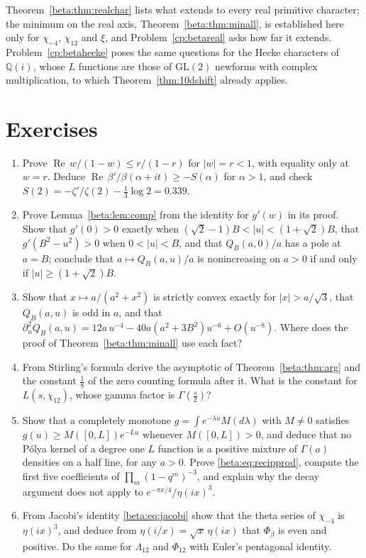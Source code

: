 Theorem~\ref{beta:thm:realchar} lists what extends to every real primitive character; the minimum on the real axis, Theorem~\ref{beta:thm:minall}, is established here only for $\chi_{-4}$, $\chi_{12}$ and $\xi$, and Problem~\ref{cp:betareal} asks how far it extends. Problem~\ref{cp:betahecke} poses the same questions for the Hecke characters of $\mathbb Q(i)$, whose $L$ functions are those of $\mathrm{GL}(2)$ newforms with complex multiplication, to which Theorem~\ref{thm:10dshift} already applies.


\section{Exercises}

\begin{enumerate}
\item Prove $\operatorname{Re}\,w/(1-w)\le r/(1-r)$ for $|w|=r<1$, with equality only at $w=r$. Deduce $\operatorname{Re}\,\beta'/\beta(\alpha+it)\ge-S(\alpha)$ for $\alpha>1$, and check $S(2)=-\zeta'/\zeta(2)-\tfrac13\log2=0.339$.
\item Prove Lemma~\ref{beta:lem:comp} from the identity for $g'(w)$ in its proof. Show that $g'(0)>0$ exactly when $(\sqrt2-1)B<|u|<(1+\sqrt2)B$, that $g'(B^2-u^2)>0$ when $0<|u|<B$, and that $Q_B(a,0)/a$ has a pole at $a=B$; conclude that $a\mapsto Q_B(a,u)/a$ is nonincreasing on $a>0$ if and only if $|u|\ge(1+\sqrt2)B$.
\item Show that $x\mapsto a/(a^2+x^2)$ is strictly convex exactly for $|x|>a/\sqrt3$, that $Q_B(a,u)$ is odd in $a$, and that $\partial_u^2Q_B(a,u)=12a\,u^{-4}-40a(a^2+3B^2)u^{-6}+O(u^{-8})$. Where does the proof of Theorem~\ref{beta:thm:minall} use each fact?
\item From Stirling's formula derive the asymptotic of Theorem~\ref{beta:thm:arg} and the constant $\tfrac18$ of the zero counting formula after it. What is the constant for $L(s,\chi_{12})$, whose gamma factor is $\Gamma(\tfrac s2)$?
\item Show that a completely monotone $g=\int e^{-\lambda u}M(d\lambda)$ with $M\ne0$ satisfies $g(u)\ge M([0,L])e^{-Lu}$ whenever $M([0,L])>0$, and deduce that no P\'olya kernel of a degree one $L$ function is a positive mixture of $\Gamma(a)$ densities on a half line, for any $a>0$. Prove \eqref{beta:eq:recipprod}, compute the first five coefficients of $\prod_m(1-q^m)^{-3}$, and explain why the decay argument does not apply to $e^{-\pi x/4}/\eta(ix)^3$.
\item From Jacobi's identity \eqref{beta:eq:jacobi} show that the theta series of $\chi_{-4}$ is $\eta(ix)^3$, and deduce from $\eta(i/x)=\sqrt x\,\eta(ix)$ that $\Phi_\beta$ is even and positive. Do the same for $\Lambda_{12}$ and $\Phi_{12}$ with Euler's pentagonal identity.

\end{enumerate}

